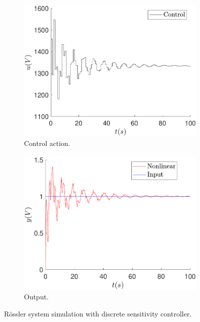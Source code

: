     \begin{figure}
        \centering
        \begin{subfigure}[b]{0.475\textwidth}
            \centering
            \includegraphics[scale=0.425]{files/heuristic/Sensitivity/control_sens_u_1.pdf}
            \caption{Control action.}
        \end{subfigure}
        \vskip0.1cm
        \begin{subfigure}[b]{0.475\textwidth}   
            \centering 
            \includegraphics[scale=0.425]{files/heuristic/Sensitivity/sens_u_1.pdf}
            \caption{Output.}
        \end{subfigure}
        \caption{Rössler system simulation with discrete sensitivity controller.}
        \label{fig:sens}
	\end{figure}
	
